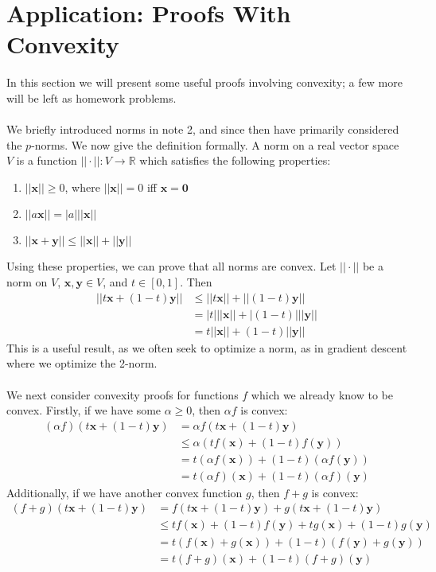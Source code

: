 \documentclass{article}
\begin{document}
\section*{Application: Proofs With Convexity}
In this section we will present some useful proofs involving convexity; a few more will be left as homework problems.\\\\
We briefly introduced norms in note 2, and since then have primarily considered the $p$-norms. We now give the definition formally. A norm on a real vector space $V$ is a function $|| \cdot ||: V \rightarrow \mathbb{R}$ which satisfies the following properties:
\begin{enumerate}[label=(\alph*)]
\item $||\mathbf{x}|| \geq 0$, where $||\mathbf{x}|| = 0$ iff $\mathbf{x} = \mathbf{0}$
\item $||a\mathbf{x}|| = |a|||\mathbf{x}||$
\item $||\mathbf{x + y}|| \leq ||\mathbf{x}|| + ||\mathbf{y}||$
\end{enumerate}
Using these properties, we can prove that all norms are convex. Let $||\cdot||$ be a norm on $V$, $\mathbf{x}, \mathbf{y} \in V$, and $t \in [0, 1]$. Then
\begin{align*}
||t\mathbf{x} + (1-t)\mathbf{y}|| &\leq ||t\mathbf{x}|| + ||(1-t)\mathbf{y}|| \\
&= |t|||\mathbf{x}|| + |(1-t)|||\mathbf{y}|| \\
&= t||\mathbf{x}|| + (1-t)||\mathbf{y}||
\end{align*}
This is a useful result, as we often seek to optimize a norm, as in gradient descent where we optimize the 2-norm. \\\\
We next consider convexity proofs for functions $f$ which we already know to be convex. Firstly, if we have some $\alpha \geq 0$, then $\alpha f$ is convex:
\begin{align*}
(\alpha f)(t\mathbf{x} + (1-t)\mathbf{y}) &= \alpha f(t\mathbf{x} + (1-t)\mathbf{y}) \\
&\leq \alpha(tf(\mathbf{x}) + (1-t)f(\mathbf{y})) \\
&= t(\alpha f(\mathbf{x})) + (1-t)(\alpha f(\mathbf{y})) \\
&= t(\alpha f)(\mathbf{x}) + (1-t)(\alpha f)(\mathbf{y})
\end{align*}
Additionally, if we have another convex function $g$, then $f + g$ is convex:
\begin{align*}
(f + g)(t\mathbf{x} + (1-t)\mathbf{y}) &= f(t\mathbf{x} + (1-t)\mathbf{y}) + g(t\mathbf{x} + (1-t)\mathbf{y}) \\
&\leq tf(\mathbf{x}) + (1-t)f(\mathbf{y}) + tg(\mathbf{x}) + (1-t)g(\mathbf{y}) \\
&= t(f(\mathbf{x}) + g(\mathbf{x})) + (1-t)(f(\mathbf{y}) + g(\mathbf{y})) \\
&= t(f + g)(\mathbf{x}) + (1-t)(f + g)(\mathbf{y})
\end{align*}
\end{document}
